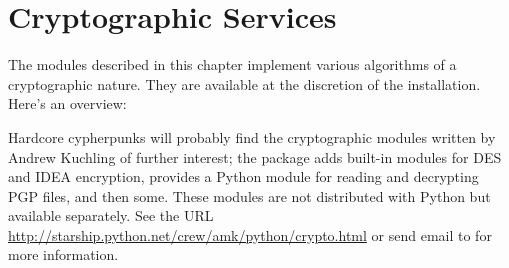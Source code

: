 \chapter{Cryptographic Services}
\label{crypto}

The modules described in this chapter implement various algorithms of
a cryptographic nature.  They are available at the discretion of the
installation.  Here's an overview:

\localmoduletable

Hardcore cypherpunks will probably find the cryptographic modules
written by Andrew Kuchling of further interest; the package adds
built-in modules for DES and IDEA encryption, provides a Python module
for reading and decrypting PGP files, and then some.  These modules
are not distributed with Python but available separately.  See the URL
\url{http://starship.python.net/crew/amk/python/crypto.html} or
send email to  for more information.
